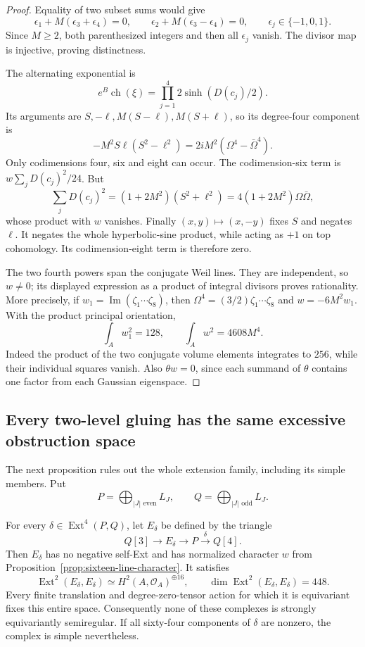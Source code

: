 \begin{proof}
Equality of two subset sums would give
\[
 \epsilon_1+M(\epsilon_3+\epsilon_4)=0,
 \qquad \epsilon_2+M(\epsilon_3-\epsilon_4)=0,
 \qquad \epsilon_j\in\{-1,0,1\}.
\]
Since $M\ge2$, both parenthesized integers and then all $\epsilon_j$ vanish. The divisor map is injective, proving distinctness.

The alternating exponential is
\[
 e^B\operatorname{ch}(\xi)
 =\prod_{j=1}^4 2\sinh(D(c_j)/2).
\]
Its arguments are $S,-\ell,M(S-\ell),M(S+\ell)$, so its degree-four component is
\[
 -M^2S\ell(S^2-\ell^2)=2iM^2(\Omega^4-\bar\Omega^4).
\]
Only codimensions four, six and eight can occur. The codimension-six term is $w\sum_jD(c_j)^2/24$. But
\[
 \sum_jD(c_j)^2=(1+2M^2)(S^2+\ell^2)
   =4(1+2M^2)\Omega\bar\Omega,
\]
whose product with $w$ vanishes. Finally $(x,y)\mapsto(x,-y)$ fixes $S$ and negates $\ell$. It negates the whole hyperbolic-sine product, while acting as $+1$ on top cohomology. Its codimension-eight term is therefore zero.

The two fourth powers span the conjugate Weil lines. They are independent, so $w\ne0$; its displayed expression as a product of integral divisors proves rationality. More precisely, if $w_1=\operatorname{Im}(\zeta_1\cdots\zeta_8)$, then $\Omega^4=(3/2)\zeta_1\cdots\zeta_8$ and $w=-6M^2w_1$. With the product principal orientation,
\[
 \int_A w_1^2=128,\qquad \int_Aw^2=4608M^4.
\]
Indeed the product of the two conjugate volume elements integrates to $256$, while their individual squares vanish. Also $\theta w=0$, since each summand of $\theta$ contains one factor from each Gaussian eigenspace.
\end{proof}

\subsection{Every two-level gluing has the same excessive obstruction space}

The next proposition rules out the whole extension family, including its simple members. Put
\[
 P=\bigoplus_{|J|\text{ even}}L_J,
 \qquad Q=\bigoplus_{|J|\text{ odd}}L_J.
\]

\begin{proposition}\label{prop:sixteen-line-gluing}
For every $\delta\in\operatorname{Ext}^4(P,Q)$, let $E_\delta$ be defined by the triangle
\[
 Q[3]\longrightarrow E_\delta\longrightarrow P
       \xrightarrow{\delta}Q[4].
\]
Then $E_\delta$ has no negative self-Ext and has normalized character $w$ from Proposition~\ref{prop:sixteen-line-character}. It satisfies
\[
 \operatorname{Ext}^2(E_\delta,E_\delta)
       \simeq H^2(A,\mathcal O_A)^{\oplus16},
 \qquad\dim\operatorname{Ext}^2(E_\delta,E_\delta)=448.
\]
Every finite translation and degree-zero-tensor action for which it is equivariant fixes this entire space. Consequently none of these complexes is strongly equivariantly semiregular. If all sixty-four components of $\delta$ are nonzero, the complex is simple nevertheless.
\end{proposition}

